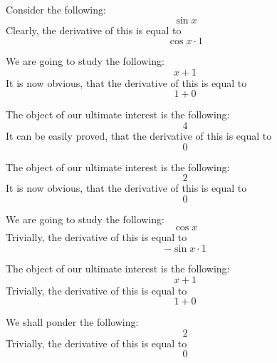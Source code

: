 \documentclass{article}
\begin{document}
Consider the following:
\begin{equation}
\sin x 
\end{equation}
Clearly, the derivative of this is equal to
\begin{equation}
\cos x \cdot 1 
\end{equation}

We are going to study the following:
\begin{equation}
x + 1 
\end{equation}
It is now obvious, that the derivative of this is equal to
\begin{equation}
1 + 0 
\end{equation}

The object of our ultimate interest is the following:
\begin{equation}
4 
\end{equation}
It can be easily proved, that the derivative of this is equal to
\begin{equation}
0 
\end{equation}

The object of our ultimate interest is the following:
\begin{equation}
2 
\end{equation}
It is now obvious, that the derivative of this is equal to
\begin{equation}
0 
\end{equation}

We are going to study the following:
\begin{equation}
\cos x 
\end{equation}
Trivially, the derivative of this is equal to
\begin{equation}
-\sin x \cdot 1 
\end{equation}

The object of our ultimate interest is the following:
\begin{equation}
x + 1 
\end{equation}
Trivially, the derivative of this is equal to
\begin{equation}
1 + 0 
\end{equation}

We shall ponder the following:
\begin{equation}
2 
\end{equation}
Trivially, the derivative of this is equal to
\begin{equation}
0 
\end{equation}
\end{document}
